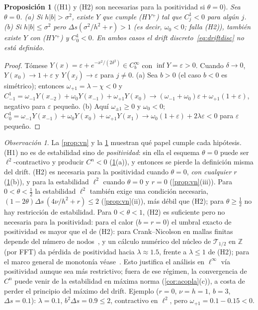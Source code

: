 \documentclass[11pt,letterpaper]{article}
\theoremstyle{plain}
\newtheorem{proposicion}[theorem]{Proposición}
\theoremstyle{definition}
\theoremstyle{remark}
\newtheorem{observacion}[theorem]{Observación}
\numberwithin{equation}{section}
\newcommand{\Z}{\mathbb{Z}}
\newcommand{\Top}{\mathcal{T}}
\begin{document}
	\begin{proposicion}[(H1) y (H2) son necesarias para la positividad si \(\theta=0\)]\label{prop:contra}
		Sea \(\theta=0\). (a) Si \(h|b|>\sigma^2\), existe \(Y\) que cumple (HY\(^+\)) tal que \(C^1_j<0\) para algún \(j\). (b) Si \(h|b|\le\sigma^2\) pero \(\Delta s(\sigma^2/h^2+r)>1\) (es decir, \(\omega_0<0\); falla (H2)), también existe \(Y\) con (HY\(^+\)) y \(C^1_0<0\). En ambos casos el drift discreto~\eqref{eq:driftdisc} no está definido.
	\end{proposicion}
	
	\begin{proof}
		Tómese \(Y(x)=\varepsilon+e^{-x^2/(2\delta^2)}\in C_b^\infty\) con \(\inf Y=\varepsilon>0\). Cuando \(\delta\to0\), \(Y(x_0)\to1+\varepsilon\) y \(Y(x_j)\to\varepsilon\) para \(j\ne0\). (a) Sea \(b>0\) (el caso \(b<0\) es simétrico); entonces \(\omega_{+1}=\lambda-\chi<0\) y \(C^1_{-1}=\omega_{-1}Y(x_{-2})+\omega_0Y(x_{-1})+\omega_{+1}Y(x_0)\to(\omega_{-1}+\omega_0)\varepsilon+\omega_{+1}(1+\varepsilon)\), negativo para \(\varepsilon\) pequeño. (b) Aquí \(\omega_{\pm1}\ge0\) y \(\omega_0<0\); \(C^1_0=\omega_{-1}Y(x_{-1})+\omega_0Y(x_0)+\omega_{+1}Y(x_1)\to\omega_0(1+\varepsilon)+2\lambda\varepsilon<0\) para \(\varepsilon\) pequeño.
	\end{proof}
	
	\begin{observacion}
		La \cref{prop:vn} y la \cref{prop:contra} muestran qué papel cumple cada hipótesis. (H1) no es de estabilidad sino de \emph{positividad}: sin ella el esquema \(\theta=0\) puede ser \(\ell^2\)-contractivo y producir \(C^n<0\) (\cref{prop:contra}(a)), y entonces se pierde la definición misma del drift. (H2) es necesaria para la positividad cuando \(\theta=0\), \emph{con cualquier} \(r\) (\cref{prop:contra}(b)), y para la estabilidad \(\ell^2\) cuando \(\theta=0\) y \(r=0\) (\cref{prop:vn}(iii)). Para \(0<\theta<\frac12\) la estabilidad \(\ell^2\) también exige una condición necesaria, \((1-2\theta)\Delta s\,(4\nu/h^2+r)\le2\) (\cref{prop:vn}(ii)), más débil que (H2); para \(\theta\ge\frac12\) no hay restricción de estabilidad. Para \(0<\theta<1\), (H2) es suficiente pero no necesaria para la positividad: para el calor (\(b=r=0\)) el umbral exacto de positividad es mayor que el de (H2): para Crank--Nicolson en mallas finitas depende del número de nodos~\cite{HigueresRoldan2023}, y un cálculo numérico del núcleo de \(\Top_{1/2}\) en \(\Z\) (por FFT) da pérdida de positividad hacia \(\lambda\approx1.5\), frente a \(\lambda\le1\) de (H2); para el marco general de monotonía véase~\cite{HundsdorferVerwer2003}. Esto justifica el análisis en \(\ell^\infty\) vía positividad aunque sea más restrictivo; fuera de ese régimen, la convergencia de \(C^n\) puede venir de la estabilidad en máxima norma (\cref{cor:acopla}(c)), a costa de perder el principio del máximo del drift. Ejemplo (\(r=0\), \(\nu=h=1\), \(b=3\), \(\Delta s=0.1\)): \(\lambda=0.1\), \(b^2\Delta s=0.9\le2\), contractivo en \(\ell^2\), pero \(\omega_{+1}=0.1-0.15<0\).
	\end{observacion}
	
\end{document}
